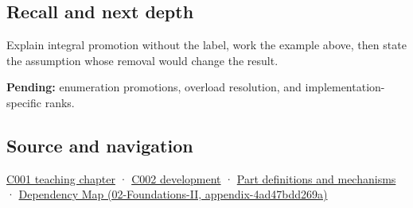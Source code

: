 \subsection{Recall and next depth}\label{recall-and-next-depth}

Explain integral promotion without the label, work the example above, then state the assumption whose removal would change the result.

\textbf{Pending:} enumeration promotions, overload resolution, and implementation-specific ranks.

\subsection{Source and navigation}\label{source-and-navigation}

\href{Continuous\%20Notes/Computing\%20Foundations\%20-\%20From\%20Bits\%20to\%20C++\%20and\%20Systems\%20APIs\#From\%20a\%20signal\%20to\%20an\%20interpretation}{C001 teaching chapter} · \href{Continuous\%20Notes/Computing\%20Foundations\%20-\%20From\%20Bits\%20to\%20C++\%20and\%20Systems\%20APIs\#Arithmetic\%20becomes\%20a\%20policy}{C002 development} · \hyperref[appendix-fd090d982a15]{Part definitions and mechanisms} · \href{}{Dependency Map (02-Foundations-II, appendix-4ad47bdd269a)}

